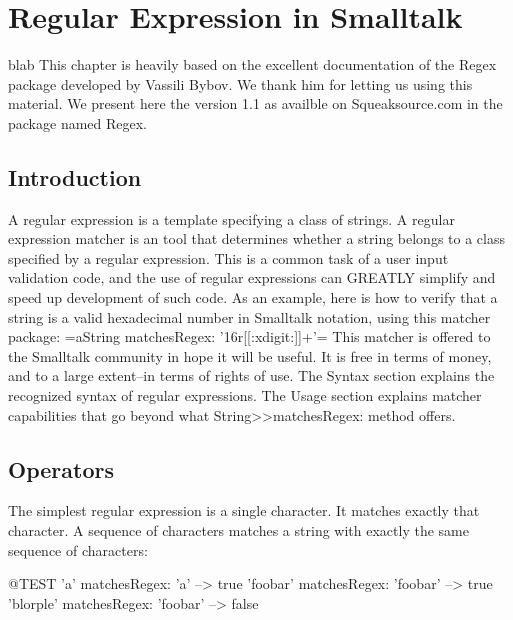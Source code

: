 \documentclass[a4paper,10pt,twoside]{book}
\begin{document}
\fi
\sloppy
\chapter{Regular Expression in Smalltalk}\label{cha:basic}


blab
This chapter is heavily based on the excellent documentation of the Regex package developed by Vassili Bybov. We thank him for letting us using this material. We present here the version 1.1 as availble on Squeaksource.com in the package named Regex. 



\section{Introduction}
A regular expression is a template specifying a class of strings. A regular 
expression matcher is an tool that determines whether a string 
belongs to a class specified by a regular expression.  This is a 
common task of a user input validation code, and the use of regular 
expressions can GREATLY simplify and speed up development of such code.  As an example, here is how to verify that a string is a valid hexadecimal number in 
Smalltalk notation, using this matcher package: \ct=aString matchesRegex: '16r[[:xdigit:]]+'=
 This matcher is offered to the Smalltalk community in hope it will be useful.
 It is free in terms of money, and to a large extent--in terms of rights of use.
 The Syntax section explains the recognized syntax of regular expressions. The 
Usage section explains matcher capabilities that go beyond what 
String>>matchesRegex: method offers.



\section{Operators}
The simplest regular expression is a single character.  It matches exactly that character. A sequence of characters matches a string with exactly the same sequence of characters:

\begin{code}{@TEST} 	
'a' matchesRegex: 'a' --> true 
'foobar' matchesRegex: 'foobar' --> true 
'blorple' matchesRegex: 'foobar' --> false
\end{code}
\end{document}
